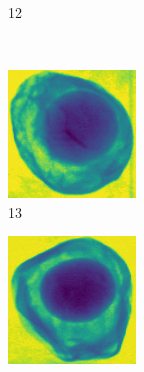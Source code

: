 \documentclass[11pt]{article}
\begin{document}
\begin{figure}[!h]
\begin{subfigure}[b]{0.22\textwidth}
         \caption{12}
         \label{fig:avo_11}
     \end{subfigure}
          \\
    \begin{subfigure}[b]{0.22\textwidth}
         \centering
         \includegraphics[width=\textwidth]{figurer/avocado_dataset/avo_12.jpg}
         \caption{13}
         \label{fig:avo_12}
     \end{subfigure}
     \hfill
     \begin{subfigure}[b]{0.22\textwidth}
         \centering
         \includegraphics[width=\textwidth]{figurer/avocado_dataset/avo_13.jpg}

\end{subfigure}
\end{figure}
\end{document}

